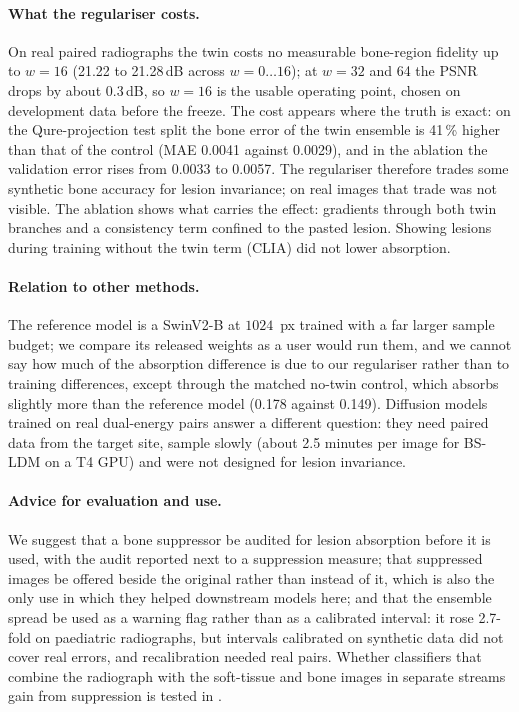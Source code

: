 \paragraph{What the regulariser costs.} On real paired radiographs the twin costs no measurable bone-region fidelity up to $w=16$ (21.22 to
21.28\,dB across $w=0\ldots16$); at $w=32$ and 64 the PSNR drops by about 0.3\,dB, so $w=16$ is the usable
operating point, chosen on development data before the freeze. The cost appears where the truth is exact: on the Qure-projection test split the
bone error of the twin ensemble is 41\,\% higher than that of the control (MAE 0.0041 against 0.0029), and in the ablation the validation error rises
from 0.0033 to 0.0057. The regulariser therefore trades some synthetic bone accuracy for lesion invariance; on real images that trade was not
visible. The ablation shows what carries the effect: gradients through both twin branches and a consistency term confined to the pasted lesion.
Showing lesions during training without the twin term (CLIA) did not lower absorption.

\paragraph{Relation to other methods.} The reference model is a SwinV2-B at $1024$~px trained with a far larger sample budget; we compare its
released weights as a user would run them, and we cannot say how much of the absorption difference is due to our regulariser rather than to
training differences, except through the matched no-twin control, which absorbs slightly more than the reference model (0.178 against 0.149). Diffusion models trained on real
dual-energy pairs \citep{sun2026bsldm,sun2026debonedit} answer a different question: they need paired data from the target site, sample slowly
(about 2.5 minutes per image for BS-LDM on a T4 GPU) and were not designed for lesion invariance.

\paragraph{Advice for evaluation and use.} We suggest that a bone suppressor be audited for lesion absorption before it is used, with the audit
reported next to a suppression measure; that suppressed images be offered beside the original rather than instead of it, which is also the only
use in which they helped downstream models here; and that the ensemble spread be used as a warning flag rather than as a calibrated interval: it
rose 2.7-fold on paediatric radiographs, but intervals calibrated on synthetic data did not cover real errors, and recalibration needed real
pairs. Whether classifiers that combine the radiograph with the soft-tissue and bone images in separate streams gain from suppression is tested
in \clsstudy.

